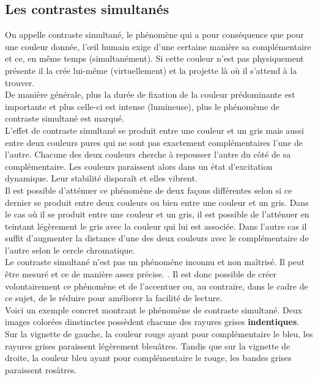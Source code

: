 \documentclass[french,a4paper]{report}
\begin{document}
{\subsection{Les contrastes simultanés}
On appelle contraste simultané, le phénomène qui a pour conséquence que pour une
couleur donnée, l'œil humain exige d'une certaine manière sa complémentaire et
ce, en même temps (simultanément).
Si cette couleur n'est pas physiquement présente il la crée lui-même (virtuellement) et
la projette là où il s'attend à la trouver.
\\
De manière générale, plus la durée de fixation de la couleur prédominante est
importante et plus celle-ci est intense (lumineuse), plus le phénomème de contraste
simultané est marqué.\\
L'effet de contraste simultané se produit entre une couleur et un gris mais
aussi entre deux couleurs pures qui ne sont pas exactement complémentaires
l'une de l'autre. Chacune des deux couleurs cherche à repousser l'autre du côté
de sa complémentaire. Les couleurs paraissent alors
dans un état d'excitation dynamique. Leur stabilité disparaît et elles vibrent.\\
Il est possible d'atténuer ce phénomène de deux façons différentes selon si ce
dernier se produit entre deux couleurs ou bien entre une couleur et un gris.
Dans le cas où il se produit entre une couleur et un gris, il est possible de
l'atténuer en teintant légèrement le gris avec la couleur qui lui est
associée. Dans l'autre cas il suffit d'augmenter la distance d'une des deux
couleurs avec le complémentaire de l'autre selon le cercle chromatique.\\
Le contraste simultané n'est pas un phénoméne inconnu et non maîtrisé. Il peut
être mesuré et ce de manière assez précise. \cite{simultContrast}. Il est donc
possible de créer volontairement ce phénomène et de l'accentuer ou, au
contraire, dans le cadre de ce sujet, de le réduire pour
améliorer la facilité de lecture. \\
Voici un exemple concret montrant le phénomène de contraste simultané. Deux
images colorées dinstinctes possèdent chacune des rayures grises
\textbf{indentiques}. Sur la vignette de gauche, la couleur rouge ayant pour
complémentaire le bleu, les rayures grises paraissent légèrement
bleuâtres. Tandis que sur la vignette de droite, la couleur bleu ayant pour
complémentaire le rouge, les bandes grises paraissent rosâtres.\\
\begin{figure}[H]

\end{figure}}
\end{document}
